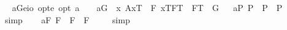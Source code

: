 \begin{isabellebody}
\isanewline
\ \isamarkupfalse%
\ a{\isacharunderscore}G{\isacharcolon}{\isacharcolon}{\isachardoublequoteopen}{\isacharparenleft}e{\isasymRightarrow}io{\isacharparenright}\ opt{\isasymRightarrow}e\ opt{\isachardoublequoteclose}\ {\isacharparenleft}{\isachardoublequoteopen}\isactrlbold a\isactrlsub {\isacharunderscore}{\isachardoublequoteclose}\ {\isacharbrackleft}{}{}{\isacharbrackright}\ {}{}{\isacharparenright}\ \ {\isachardoublequoteopen}\isactrlbold a\isactrlsub G\ {\isasymequiv}\ \isactrlbold {\isasymiota}x{\isachardot}\ {\isacharparenleft}{\isasymlparr}A{\isacharbang}{\isacharcomma}x\isactrlsup T{\isasymrparr}\ \isactrlbold {\isasymand}\ {\isacharparenleft}\isactrlbold {\isasymforall}F{\isachardot}\ {\isasymlbrace}x\isactrlsup T{\isacharcomma}F\isactrlsup T{\isasymrbrace}\ \isactrlbold {\isasymequiv}\ {\isacharparenleft}F\isactrlsup T\ \isactrlbold {\isacharequal}\ G{\isacharparenright}{\isacharparenright}{\isacharparenright}{\isachardoublequoteclose}%
\isamarkuptrue%
%
\isamarkuptrue%
\ \isamarkupfalse%
\ a{}{}{\isacharunderscore}{}{\isacharunderscore}P{\isacharcolon}\ {\isachardoublequoteopen}{\isacharbrackleft}{\isasymphi}\isactrlsup P\ \isactrlbold {\isasymrightarrow}\ {\isacharparenleft}{\isasymphi}\isactrlsup P\ \isactrlbold {\isasymrightarrow}\ {\isasymphi}\isactrlsup P{\isacharparenright}{\isacharbrackright}\ {\isacharequal}\ {\isasymtop}{\isachardoublequoteclose}%
\isadelimproof
\ %
\endisadelimproof
%
\isatagproof
{}\isamarkupfalse%
\ simp\ \isamarkupfalse%
%
\endisatagproof
{\isafoldproof}%
%
\isadelimproof
%
\endisadelimproof
\isanewline
\ \isamarkupfalse%
\ a{}{}{\isacharunderscore}{}{\isacharunderscore}F{\isacharcolon}\ {\isachardoublequoteopen}{\isacharbrackleft}{\isasymphi}\isactrlsup F\ \isactrlbold {\isasymrightarrow}\ {\isacharparenleft}{\isasymphi}\isactrlsup F\ \isactrlbold {\isasymrightarrow}\ {\isasymphi}\isactrlsup F{\isacharparenright}{\isacharbrackright}\ {\isacharequal}\ {\isasymtop}{\isachardoublequoteclose}%
\isadelimproof
\ %
\endisadelimproof
%
\isatagproof
{}\isamarkupfalse%
\ simp\ \isamarkupfalse%
%
\endisatagproof
{\isafoldproof}%
%
\isadelimproof
%
\endisadelimproof
\isanewline
\ \isamarkupfalse%

\end{isabellebody}

